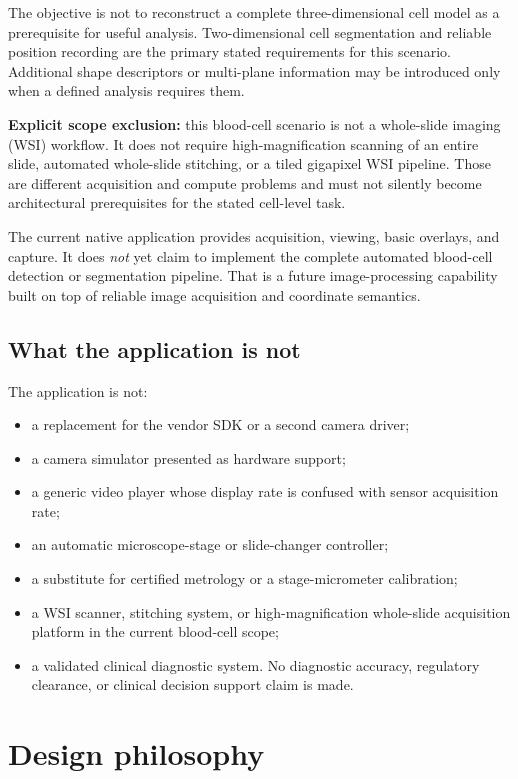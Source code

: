 \documentclass[11pt,a4paper,oneside]{article}
\begin{document}
The objective is not to reconstruct a complete three-dimensional cell model as a prerequisite for useful analysis. Two-dimensional cell segmentation and reliable position recording are the primary stated requirements for this scenario. Additional shape descriptors or multi-plane information may be introduced only when a defined analysis requires them.

\textbf{Explicit scope exclusion:} this blood-cell scenario is not a whole-slide imaging (WSI) workflow. It does not require high-magnification scanning of an entire slide, automated whole-slide stitching, or a tiled gigapixel WSI pipeline. Those are different acquisition and compute problems and must not silently become architectural prerequisites for the stated cell-level task.

The current native application provides acquisition, viewing, basic overlays, and capture. It does \emph{not} yet claim to implement the complete automated blood-cell detection or segmentation pipeline. That is a future image-processing capability built on top of reliable image acquisition and coordinate semantics.

\subsection{What the application is not}
The application is not:
\begin{itemize}
  \item a replacement for the vendor SDK or a second camera driver;
  \item a camera simulator presented as hardware support;
  \item a generic video player whose display rate is confused with sensor acquisition rate;
  \item an automatic microscope-stage or slide-changer controller;
  \item a substitute for certified metrology or a stage-micrometer calibration;
  \item a WSI scanner, stitching system, or high-magnification whole-slide acquisition platform in the current blood-cell scope;
  \item a validated clinical diagnostic system. No diagnostic accuracy, regulatory clearance, or clinical decision support claim is made.
\end{itemize}

\section{Design philosophy}
\end{document}
